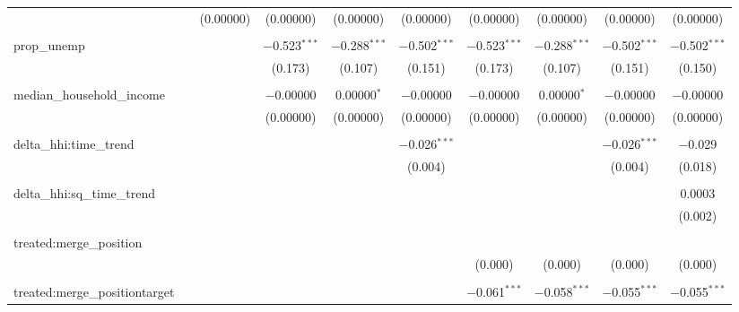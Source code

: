 \begin{table}[H]
{\begin{tabular}{@{\extracolsep{5pt}}lccccccccc}
   &  & (0.00000) & (0.00000) & (0.00000) & (0.00000) & (0.00000) & (0.00000) & (0.00000) & (0.00000) \\  

   & & & & & & & & & \\  

  prop\_unemp &  &  & $-$0.523$^{***}$ & $-$0.288$^{***}$ & $-$0.502$^{***}$ & $-$0.523$^{***}$ & $-$0.288$^{***}$ & $-$0.502$^{***}$ & $-$0.502$^{***}$ \\  

   &  &  & (0.173) & (0.107) & (0.151) & (0.173) & (0.107) & (0.151) & (0.150) \\  

   & & & & & & & & & \\  

  median\_household\_income &  &  & $-$0.00000 & 0.00000$^{*}$ & $-$0.00000 & $-$0.00000 & 0.00000$^{*}$ & $-$0.00000 & $-$0.00000 \\  

   &  &  & (0.00000) & (0.00000) & (0.00000) & (0.00000) & (0.00000) & (0.00000) & (0.00000) \\  

   & & & & & & & & & \\  

  delta\_hhi:time\_trend &  &  &  &  & $-$0.026$^{***}$ &  &  & $-$0.026$^{***}$ & $-$0.029 \\  

   &  &  &  &  & (0.004) &  &  & (0.004) & (0.018) \\  

   & & & & & & & & & \\  

  delta\_hhi:sq\_time\_trend &  &  &  &  &  &  &  &  & 0.0003 \\  

   &  &  &  &  &  &  &  &  & (0.002) \\  

   & & & & & & & & & \\  

  treated:merge\_position &  &  &  &  &  &  &  &  &  \\  

   &  &  &  &  &  & (0.000) & (0.000) & (0.000) & (0.000) \\  

   & & & & & & & & & \\  

  treated:merge\_positiontarget &  &  &  &  &  & $-$0.061$^{***}$ & $-$0.058$^{***}$ & $-$0.055$^{***}$ & $-$0.055$^{***}$ \\  


\end{tabular}}
\end{table}
